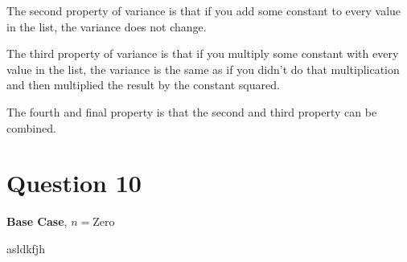 \documentclass{article}
\begin{document}
The second property of variance is that if you add some constant to every value in the list, the variance does not change.

The third property of variance is that if you multiply some constant with every value in the list, the variance is the same as if you didn't do that multiplication and then multiplied the result by the constant squared.

The fourth and final property is that the second and third property can be combined.

\clearpage

\section{Question 10}

\textbf{Base Case}, $n = \text{Zero}$
  
  asldkfjh
\end{document}
